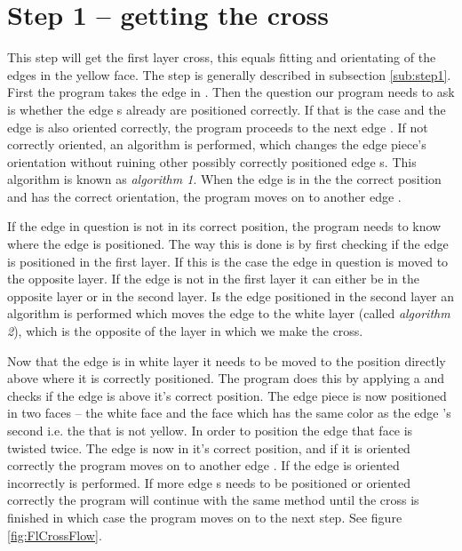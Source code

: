\section{Step 1 -- getting the cross}
This step will get the first layer cross, this equals fitting and orientating of the edges in the yellow face. 
The step is generally described in subsection \ref{sub:step1}.
First the program takes the edge \cubie{} in \cubicle{} .
Then the question our program needs to ask is whether the edge \cpiece{}s already are positioned correctly.
If that is the case and the edge \cpiece{} is also oriented correctly, the program proceeds to the next edge \cpiece{}.
If not correctly oriented, an algorithm is performed, which changes the edge piece's orientation without ruining other possibly correctly positioned edge \cpiece{}s. 
This algorithm is known as \textit{algorithm 1}. When the edge \cpiece{} is in the the correct position and has the correct orientation, the program moves on to another edge \cpiece{}. 

If the edge \cpiece{} in question is not in its correct position, the program needs to know where the edge is positioned. 
The way this is done is by first checking if the edge \cpiece{} is positioned in the first layer. 
If this is the case the edge \cpiece{} in question is moved to the opposite layer. 
If the edge \cpiece{} is not in the first layer it can either be in the opposite layer or in the second layer.
Is the edge \cpiece{}  positioned in the second layer an algorithm is performed which moves the edge \cpiece{}  to the white layer (called \textit{algorithm 2}), which is the opposite of the layer in which we make the cross.

Now that the edge \cpiece{}  is in white layer it needs to be moved to the position directly above where it is correctly positioned. 
The program does this by applying a  \twist{} and checks if the edge \cpiece{} is above it's correct position.
The edge piece is now positioned in two faces -- the white face and the face which has the same color as the edge  \cpiece{}'s second \facelet{} i.e. the \facelet{} that is not yellow.
In order to position the edge \cpiece{} that face is twisted twice.
The edge \cpiece{} is now in it's correct position, and if it is oriented correctly the program moves on to another edge  \cpiece{} .
If the edge \cpiece{} is oriented incorrectly  is performed. If more edge  \cpiece{}s needs to be positioned or oriented correctly the program will continue with the same method until the cross is finished in which case the program moves on to the next step. See figure \ref{fig:FlCrossFlow}.

